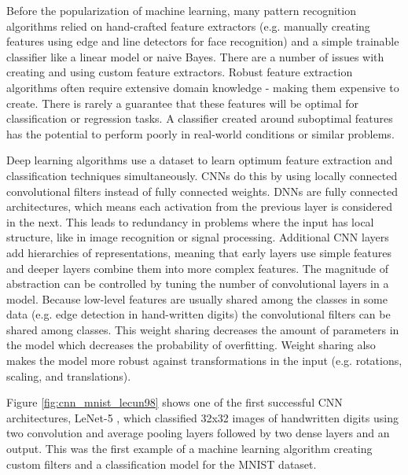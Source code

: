 Before the popularization of machine learning, many pattern recognition algorithms relied on hand-crafted feature extractors (e.g. manually creating features using edge and line detectors for face recognition) and a simple trainable classifier like a linear model or naive Bayes. There are a number of issues with creating and using custom feature extractors. Robust feature extraction algorithms often require extensive domain knowledge - making them expensive to create. There is rarely a guarantee that these features will be optimal for classification or regression tasks. A classifier created around suboptimal features has the potential to perform poorly in real-world conditions or similar problems.

Deep learning algorithms use a dataset to learn optimum feature extraction and classification techniques simultaneously. CNNs do this by using locally connected convolutional filters instead of fully connected weights. DNNs are fully connected architectures, which means each activation from the previous layer is considered in the next. This leads to redundancy in problems where the input has local structure, like in image recognition or signal processing. Additional CNN layers add hierarchies of representations, meaning that early layers use simple features and deeper layers combine them into more complex features. The magnitude of abstraction can be controlled by tuning the number of convolutional layers in a model. Because low-level features are usually shared among the classes in some data (e.g. edge detection in hand-written digits) the convolutional filters can be shared among classes. This weight sharing decreases the amount of parameters in the model which decreases the probability of overfitting. Weight sharing also makes the model more robust against transformations in the input (e.g. rotations, scaling, and translations).

Figure \ref{fig:cnn_mnist_lecun98} shows one of the first successful CNN architectures, LeNet-5 \cite{Lecun1998}, which classified 32x32 images of handwritten digits using two convolution and average pooling layers followed by two dense layers and an output. This was the first example of a machine learning algorithm creating custom filters and a classification model for the MNIST dataset. 



